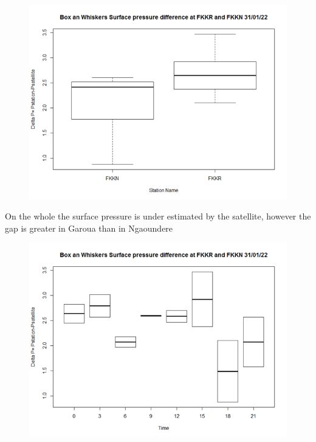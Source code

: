 \begin{figure}[H]
\begin{center}
\includegraphics[scale=0.6]{a1.png} %
\end{center}
\end{figure}
On the whole the surface pressure is under estimated by the satellite, however  the gap is greater in Garoua than in Ngaoundere
\begin{figure}[H]
\begin{center}
\includegraphics[scale=0.6]{a2.png} %
\end{center}
\end{figure}
